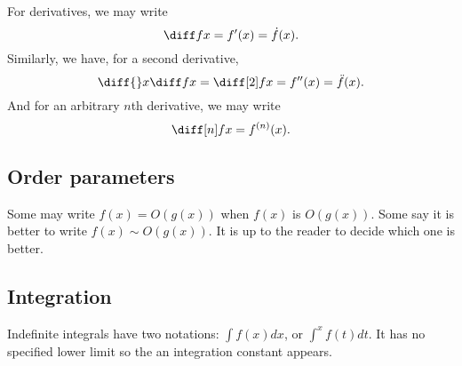 \documentclass[12pt]{article}
\begin{document}
For derivatives, we may write
\[
    \diff f x = f'(x) = \dot f(x).
\]
Similarly, we have, for a second derivative,
\[
    \diff {}x \diff f x = \diff[2] f x = f''(x) = \ddot f(x).
\]
And for an arbitrary $n$th derivative, we may write
\[
    \diff[n] f x = f^{(n)}(x).
\]

\subsection{Order parameters}

Some may write $f(x) = O(g(x))$ when $f(x)$ is $O(g(x))$.
Some say it is better to write $f(x) \sim O(g(x))$.
It is up to the reader to decide which one is better.

\subsection{Integration}

Indefinite integrals have two notations: $\int f(x)dx$, or $\int^x f(t)dt$.
It has no specified lower limit so the an integration constant appears.
\end{document}
